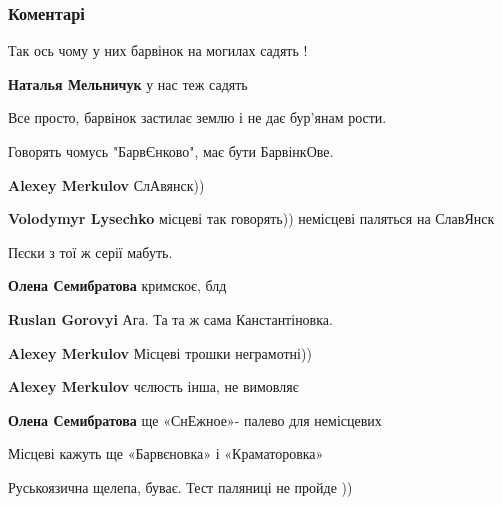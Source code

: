  
 
 
 
 
\subsubsection{Коментарі}

\begin{itemize} %
Так ось чому у них барвінок на могилах садять !

\begin{itemize} %
\textbf{Наталья Мельничук} у нас теж садять

Все просто, барвінок застилає землю і не дає бур'янам рости.
\end{itemize} %

Говорять чомусь "БарвЄнково", має бути БарвінкОве.

\begin{itemize} %
\textbf{Alexey Merkulov} СлАвянск))

\textbf{Volodymyr Lysechko} місцеві так говорять)) немісцеві паляться на СлавЯнск

Пєски з тої ж серії мабуть.

\textbf{Олена Семибратова} кримскоє, блд

\textbf{Ruslan Gorovyi} Ага. Та та ж сама Канстантіновка.

\textbf{Alexey Merkulov} Місцеві трошки неграмотні))

\textbf{Alexey Merkulov} чєлюсть інша, не вимовляє

\textbf{Олена Семибратова} ще «СнЕжное»- палево для немісцевих

Місцеві кажуть ще «Барвєновка» і «Краматоровка»

\end{itemize} %

Руськоязична щелепа, буває. Тест паляниці не пройде ))


\end{itemize}

